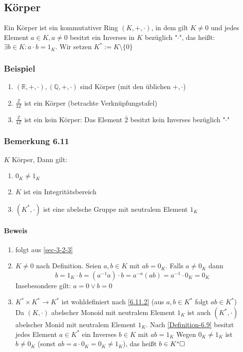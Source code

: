 \documentclass[a4paper]{scrartcl}
\theoremstyle{definition}
\theoremstyle{plain}
\theoremstyle{plain}
\theoremstyle{remark}
\theoremstyle{remark}
\theoremstyle{remark}
\begin{document}
\subsection{Körper}
\label{sec-3-3}
\label{Definition-6.9}
Ein Körper ist ein kommutativer Ring $(K,+,\cdot)$, in dem gilt $K\neq 0$ und jedes Element $a\in K, a\neq 0$ besitzt ein Inverses in $K$ bezüglich "$\cdot$", das heißt: $\exists b\in K:a\cdot b = 1_K$. Wir setzen $K^\ast := K\setminus\{0\}$
\subsubsection{Beispiel}
\label{sec-3-3-1}
\begin{enumerate}
\item $(\mathbb{R},+,\cdot),(\mathbb{Q},+,\cdot)$ sind Körper (mit den üblichen $+,\cdot$)
\item $\frac{\mathbb{Z}}{3\mathbb{Z}}$ ist ein Körper (betrachte Verknüpfungstafel)
\item $\frac{\mathbb{Z}}{4\mathbb{Z}}$ ist ein kein Körper: Das Element $\bar 2$ besitzt kein Inverses bezüglich "$\cdot$"
\end{enumerate}
\subsubsection{Bemerkung 6.11}
\label{sec-3-3-2}
\label{remark:integ_neutral}
$K$ Körper, Dann gilt:
\begin{enumerate}
\item $0_K \neq 1_K$
\item \label{6.11.2} $K$ ist ein Integritätsbereich
\item $(K^\ast,\cdot)$ ist eine abelsche Gruppe mit neutralem Element $1_K$
\end{enumerate}
\paragraph{Beweis}
\label{sec-3-3-2-1}
\begin{enumerate}
\item folgt aus \ref{sec-3-2-3}
\item $K\neq 0$ nach Definition. Seien $a,b\in K$ mit $a b = 0_K$. Falls $a\neq 0_K$ dann
\[b = 1_K \cdot b = (a^{-1} a)\cdot b = a^{-a}(a b) = a^{-1}\cdot 0_K = 0_K\]
Insebesondere gilt: $a = 0\vee b = 0$
\item $K^\ast\times K^\ast \to K^\ast$ ist wohldefiniert nach \ref{6.11.2} (aus $a,b\in K^\ast$ folgt $a b\in K^\ast$) \\
        Da $(K,\cdot)$ abelscher Monoid mit neutralem Element $1_K$ ist auch $(K^\ast,\cdot)$ abelscher Monid mit neutralem Element $1_K$.
Nach \ref{Definition-6.9} besitzt jedes Element $a\in K^\ast$ ein Inverses $b\in K$ mit $a b = 1_K$ Wegen $0_K \neq 1_K$ ist $b\neq 0_K$ (sonst $a b = a\cdot 0_K = 0_K \neq 1_K$), das heißt $b\in K^\ast\hfill\square$
\end{enumerate}
\end{document}
